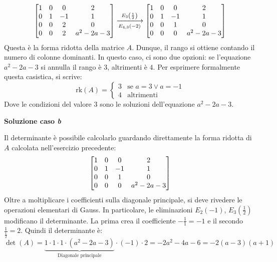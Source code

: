 \documentclass[a4paper]{article}
\makeatletter
\newenvironment{rowequmatbra}[1]{\left[\array{@{}#1@{}}}{\endarray\right]}
\makeatother
\begin{document}
	\begin{equation*}
		\begin{rowequmatbra}{cccc}
			1 & 0 & 0 & 2 	\\
			0 & 1 & -1 & 1 	\\
			0 & 0 & 2 & 0 	\\
			0 & 0 & 2 & a^{2}-2a-3
		\end{rowequmatbra}
		\xlongrightarrow[E_{4,3}\left(-2\right)]{E_{3}\left(\frac{1}{2}\right)}
		\begin{rowequmatbra}{cccc}
			1 & 0 & 0 & 2 	\\
			0 & 1 & -1 & 1 	\\
			0 & 0 & 1 & 0 	\\
			0 & 0 & 0 & a^{2}-2a-3
		\end{rowequmatbra}
	\end{equation*}
	Questa è la forma ridotta della matrice $A$. Dunque, il rango si ottiene contando il numero di colonne dominanti. In questo caso, ci sono due opzioni: se l'equazione $a^{2}-2a-3$ si annulla il rango è $3$, altrimenti è $4$. Per esprimere formalmente questa casistica, si scrive:
	\begin{equation*}
		\mathrm{rk}\left(A\right) = \begin{cases}
			3 & \text{se } a=3 \lor a=-1 \\
			4 & \text{altrimenti}
		\end{cases}
	\end{equation*}
	Dove le condizioni del valore $3$ sono le soluzioni dell'equazione $a^{2}-2a-3$.\newpage
	
	\noindent
	\textcolor{Green4}{\textbf{Soluzione caso \emph{b}}}\newline
	
	\noindent
	Il determinante è possibile calcolarlo guardando direttamente la forma ridotta di $A$ calcolata nell'esercizio precedente:
	\begin{equation*}
		\begin{rowequmatbra}{cccc}
			1 & 0 & 0 & 2 	\\
			0 & 1 & -1 & 1 	\\
			0 & 0 & 1 & 0 	\\
			0 & 0 & 0 & a^{2}-2a-3
		\end{rowequmatbra}
	\end{equation*}
	Oltre a moltiplicare i coefficienti sulla diagonale principale, si deve rivedere le operazioni elementari di Gauss. In particolare, le eliminazioni $E_{2}\left(-1\right)$, $E_{3}\left(\frac{1}{2}\right)$ modificano il determinante. La prima crea il coefficiente $-\frac{1}{1} = -1$ e il secondo $\frac{1}{\frac{1}{2}} = 2$. Quindi il determinante è:
	\begin{equation*}
		\det\left(A\right) = \underbrace{1 \cdot 1 \cdot 1 \cdot \left(a^{2}-2a-3\right)}_{\text{Diagonale principale}} \cdot \left(-1\right) \cdot 2 = -2a^{2} -4a -6 = -2\left(a-3\right)\left(a+1\right)
	\end{equation*}
	
\end{document}

